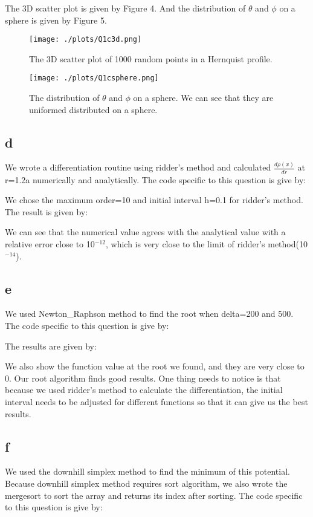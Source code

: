 The 3D scatter plot is given by Figure 4. And the distribution of $\theta$ and $\phi$ on a sphere is given by Figure 5.

\begin{figure}[h!]
  \centering
  \texttt{[image: ./plots/Q1c3d.png]}
  \caption{The 3D scatter plot of 1000 random points in a Hernquist profile.}
  \label{fig4}
\end{figure}


\begin{figure}[h!]
  \centering
  \texttt{[image: ./plots/Q1csphere.png]}
  \caption{The distribution of $\theta$ and $\phi$ on a sphere. We can see that they are uniformed distributed on a sphere.}
  \label{fig5}
\end{figure}

\subsection{d}
We wrote a differentiation routine using ridder's method and calculated $\frac{d\rho(x)}{dr}$ at r=1.2a numerically and analytically.
The code specific to this question is give by:


We chose the maximum order=10 and initial interval h=0.1 for ridder's method. The result is given by:

We can see that the numerical value agrees with the analytical value with a relative error close to 10$^{-12}$, which is very close to the limit of ridder's method(10$^{-14}$).

\subsection{e}
We used Newton\_Raphson method to find the root when delta=200 and 500.
The code specific to this question is give by:


The results are given by:

We also show the function value at the root we found, and they are very close to 0. Our root algorithm finds good results. One thing needs to notice is that because we used ridder's method to calculate the differentiation, the initial interval needs to be adjusted for different functions so that it can give us the best results.

\subsection{f}
We used the downhill simplex method to find the minimum of this potential. Because downhill simplex method requires sort algorithm, we also wrote the mergesort to sort the array and returns its index after sorting.
The code specific to this question is give by:


